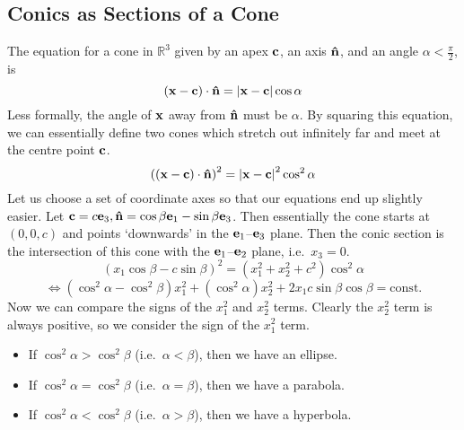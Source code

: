 \subsection{Conics as Sections of a Cone}
The equation for a cone in \(\mathbb R^3\) given by an apex \(\vb c\), an axis \(\vu{n}\), and an angle \(\alpha < \frac{\pi}{2}\), is
\[
	(\vb x - \vb c)\cdot\vu{n} = \abs{\vb x - \vb c}\cos \alpha
\]
Less formally, the angle of \(\vb x\) away from \(\vu{n}\) must be \(\alpha\).
By squaring this equation, we can essentially define two cones which stretch out infinitely far and meet at the centre point \(\vb c\).
\[
	\left( (\vb x - \vb c)\cdot\vu{n} \right)^2 = \abs{\vb x - \vb c}^2\cos^2 \alpha
\]
Let us choose a set of coordinate axes so that our equations end up slightly easier.
Let \(\vb c = c\vb e_3, \vu{n} = \cos\beta \vb e_1 - \sin\beta \vb e_3\).
Then essentially the cone starts at \((0, 0, c)\) and points `downwards' in the \(\vb e_1\)--\(\vb e_3\) plane.
Then the conic section is the intersection of this cone with the \(\vb e_1\)--\(\vb e_2\) plane, i.e.\ \(x_3 = 0\).
\[
	(x_1\cos\beta - c\sin\beta)^2 = (x_1^2 + x_2^2 + c^2)\cos^2\alpha
\]
\[
	\iff (\cos^2\alpha - \cos^2\beta)x_1^2 + (\cos^2\alpha)x_2^2 + 2x_1c\sin\beta\cos\beta = \text{const.}
\]
Now we can compare the signs of the \(x_1^2\) and \(x_2^2\) terms.
Clearly the \(x_2^2\) term is always positive, so we consider the sign of the \(x_1^2\) term.
\begin{itemize}
	\item If \(\cos^2 \alpha > \cos^2\beta\) (i.e.\ \(\alpha < \beta\)), then we have an ellipse.
	\item If \(\cos^2 \alpha = \cos^2\beta\) (i.e.\ \(\alpha = \beta\)), then we have a parabola.
	\item If \(\cos^2 \alpha < \cos^2\beta\) (i.e.\ \(\alpha > \beta\)), then we have a hyperbola.
\end{itemize}
